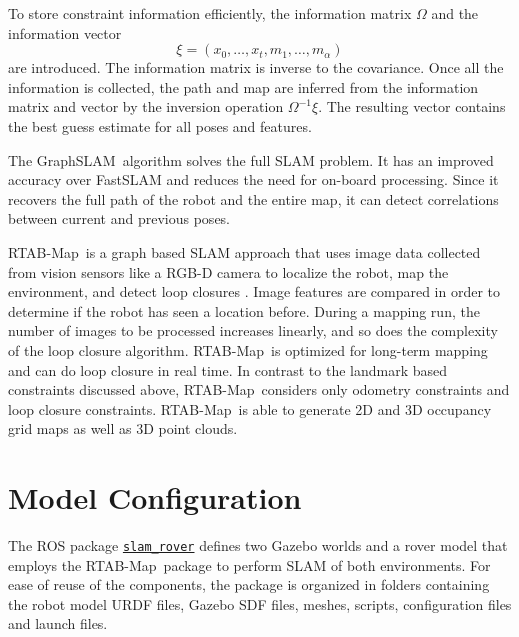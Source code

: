 \documentclass[10pt, journal, compsoc]{IEEEtran}
\newcommand{\rtab}{RTAB-Map}
\newcommand{\gs}{GraphSLAM}
\begin{document}
To store constraint information efficiently, the information matrix $\Omega$ and the information vector
\begin{equation*}
\xi = \left( x_0 , \ldots , x_t , m_1 , \ldots , m_{\alpha} \right)
\end{equation*}
are introduced. The information matrix is inverse to the covariance. Once all the information is collected, the path and map are inferred from the information matrix and vector by the inversion operation $\Omega^{-1} \xi$. The resulting vector contains the best guess estimate for all poses and features.

The \gs\ algorithm solves the full SLAM problem. It has an improved accuracy over FastSLAM and reduces the need for on-board processing. Since it recovers the full path of the robot and the entire map, it can detect correlations between current and previous poses.

\rtab\ is a graph based SLAM approach that uses image data collected from vision sensors like a RGB-D camera to localize the robot, map the environment, and detect loop closures \cite{labbe14online, labbe13appearance}. Image features are compared in order to determine if the robot has seen a location before. During a mapping run, the number of images to be processed increases linearly, and so does the complexity of the loop closure algorithm. \rtab\ is optimized for long-term mapping and can do loop closure in real time. In contrast to the landmark based constraints discussed above, \rtab\ considers only odometry constraints and loop closure constraints. \rtab\ is able to generate 2D and 3D occupancy grid maps as well as 3D point clouds.

\section{Model Configuration}
\label{sec:model_configuration}
The ROS package \href{https://github.com/S2H-Mobile/RoboND-SLAM-Project/tree/master/slam_rover}{\texttt{slam\_rover}} defines two Gazebo worlds and a rover model that employs the \rtab\ package to perform SLAM of both environments. For ease of reuse of the components, the package is organized in folders containing the robot model URDF files, Gazebo SDF files, meshes, scripts, configuration files and launch files.
\end{document}
